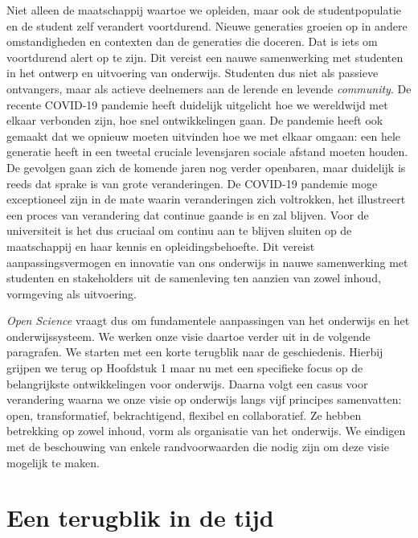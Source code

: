 \documentclass[smallauthor, chapterhaspagenum, nochapterinheader, pagenuminheader,  bigchapnum,medium2, tocpages, garamond, titleinheader]{jote-book}
\begin{document}
	Niet alleen de maatschappij waartoe we opleiden, maar ook de studentpopulatie en de student zelf verandert voortdurend. Nieuwe generaties groeien op in andere omstandigheden en contexten dan de generaties die doceren. Dat is iets om voortdurend alert op te zijn. Dit vereist een nauwe samenwerking met studenten in het ontwerp en uitvoering van onderwijs. Studenten dus niet als passieve ontvangers, maar als actieve deelnemers aan de lerende en levende \emph{community}. De recente COVID-19 pandemie heeft duidelijk uitgelicht hoe we wereldwijd met elkaar verbonden zijn, hoe snel ontwikkelingen gaan. De pandemie heeft ook gemaakt dat we opnieuw moeten uitvinden hoe we met elkaar omgaan: een hele generatie heeft in een tweetal cruciale levensjaren sociale afstand moeten houden. De gevolgen gaan zich de komende jaren nog verder openbaren, maar duidelijk is reeds dat sprake is van grote veranderingen. De COVID-19 pandemie moge exceptioneel zijn in de mate waarin veranderingen zich voltrokken, het illustreert een proces van verandering dat continue gaande is en zal blijven. Voor de universiteit is het dus cruciaal om continu aan te blijven sluiten op de maatschappij en haar kennis en opleidingsbehoefte. Dit vereist aanpassingsvermogen en innovatie van ons onderwijs in nauwe samenwerking met studenten en stakeholders uit de samenleving ten aanzien van zowel inhoud, vormgeving als uitvoering.



	\emph{Open }\emph{Science} vraagt dus om fundamentele aanpassingen van het onderwijs en het onderwijssysteem. We werken onze visie daartoe verder uit in de volgende paragrafen. We starten met een korte terugblik naar de geschiedenis. Hierbij grijpen we terug op Hoofdstuk 1 maar nu met een specifieke focus op de belangrijkste ontwikkelingen voor onderwijs. Daarna volgt een casus voor verandering waarna we onze visie op onderwijs langs vijf principes samenvatten: open, transformatief, bekrachtigend, flexibel en collaboratief. Ze hebben betrekking op zowel inhoud, vorm als organisatie van het onderwijs. We eindigen met de beschouwing van enkele randvoorwaarden die nodig zijn om deze visie mogelijk te maken.



	\section{Een terugblik in de tijd}
\end{document}

